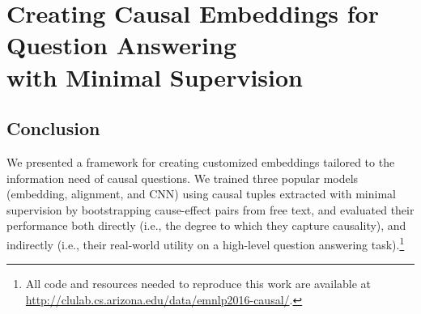 
\chapter{Creating Causal Embeddings for Question Answering \\with Minimal Supervision \label{chapter:emnlp2016}}



%
%







\section{Conclusion}
\label{sec-emnlp2016:conclusion}
We presented a framework for creating customized embeddings tailored to the information need of causal questions.  We trained three popular models (embedding, alignment, and CNN) using causal tuples extracted with minimal supervision by bootstrapping cause-effect pairs from free text, and evaluated their performance both directly (i.e., the degree to which they capture causality), and indirectly (i.e., their real-world utility on a high-level question answering task).\footnote{All code and resources needed to reproduce this work are  available at \url{http://clulab.cs.arizona.edu/data/emnlp2016-causal/}.} 


